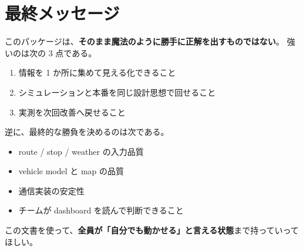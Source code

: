 \documentclass[a4paper,11pt]{article}
\begin{document}
\section{最終メッセージ}

このパッケージは、\textbf{そのまま魔法のように勝手に正解を出すものではない}。
強いのは次の 3 点である。

\begin{enumerate}
  \item 情報を 1 か所に集めて見える化できること
  \item シミュレーションと本番を同じ設計思想で回せること
  \item 実測を次回改善へ戻せること
\end{enumerate}

逆に、最終的な勝負を決めるのは次である。

\begin{itemize}
  \item route / stop / weather の入力品質
  \item vehicle model と map の品質
  \item 通信実装の安定性
  \item チームが dashboard を読んで判断できること
\end{itemize}

この文書を使って、\textbf{全員が「自分でも動かせる」と言える状態}まで持っていってほしい。
\end{document}
